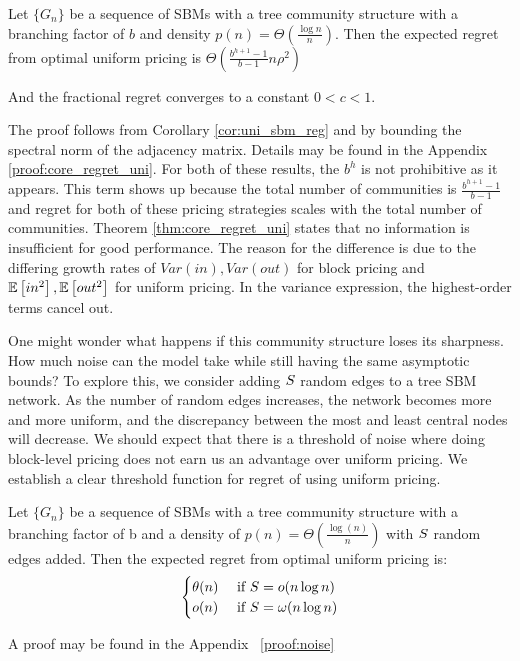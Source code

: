 \begin{theorem}\label{thm:core_regret_uni}
   Let $\{G_n\}$ be a sequence of SBMs with a tree community structure with a branching factor of $b$ and density $p(n) = \Theta( \frac{\log n}{n})$. Then the expected regret from optimal uniform pricing is $\Theta\left(\frac{b^{h+1} -1 }{b-1} n \rho^2\right)$

    And the fractional regret converges to a constant $0<c<1$. 
\end{theorem}

The proof follows from Corollary \ref{cor:uni_sbm_reg} and by bounding the spectral norm of the adjacency matrix. Details may be found in the Appendix \ref{proof:core_regret_uni}. For both of these results, the $b^h$ is not prohibitive as it appears. This term shows up because the total number of communities is $\frac{b^{h+1} - 1}{b-1}$ and regret for both of these pricing strategies scales with the total number of communities. Theorem \ref{thm:core_regret_uni} states that no information is insufficient for good performance. The reason for the difference is due to the differing growth rates of $Var(in), Var(out)$ for block pricing and $\ex{in^2}, \ex{out^2}$ for uniform pricing. In the variance expression, the highest-order terms cancel out. 

One might wonder what happens if this community structure loses its sharpness. How much noise can the model take while still having the same asymptotic bounds? To explore this, we consider adding $\S$ random edges to a tree SBM network. As the number of random edges increases, the network becomes more and more uniform, and the discrepancy between the most and least central nodes will decrease.  We should expect that there is a threshold of noise where doing block-level pricing does not earn us an advantage over uniform pricing. We establish a clear threshold function for regret of using uniform pricing. 


\begin{theorem}\label{thm:noise}
    Let $\{G_n\}$ be a sequence of SBMs with a tree community structure with a branching factor of b and a density of $p(n) = \Theta \left( \frac{ \log(n)}{n} \right) $ with $\S$ random edges added. Then the expected regret from optimal uniform pricing is:
    \begin{equation}
       \begin{cases} 
        \theta(n) & \text{ if } \S = o(n \log n) \\ 
        o(n) & \text{ if } \S = \omega (n \log n)
        \end{cases}
    \end{equation}
\end{theorem}
A proof may be found in the Appendix ~\ref{proof:noise} 

